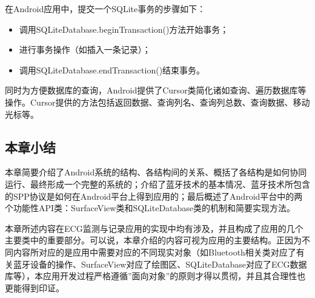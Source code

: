 在Android应用中，提交一个SQLite事务的步骤如下：
\begin{itemize}
\item	调用SQLiteDatabase.beginTransaction()方法开始事务；
\item	进行事务操作（如插入一条记录）；
\item	调用SQLiteDatabase.endTransaction()结束事务。
\end{itemize}

同时为方便数据库的查询，Android提供了Cursor类简化诸如查询、遍历数据库等操作。Cursor提供的方法包括返回数据、查询列名、查询列总数、查询数据、移动光标等。

\subsection{本章小结}

本章简要介绍了Android系统的结构、各结构间的关系、概括了各结构是如何协同运行、最终形成一个完整的系统的；介绍了蓝牙技术的基本情况、蓝牙技术所包含的SPP协议是如何在Android平台上得到应用的；最后概述了Android平台中的两个功能性API类：SurfaceView类和SQLiteDatabase类的机制和简要实现方法。

本章所述内容在ECG监测与记录应用的实现中均有涉及，并且构成了应用的几个主要类中的重要部分。可以说，本章介绍的内容可视为应用的主要结构。正因为不同内容所对应的是应用中需要对应的不同现实对象（如Bluetooth相关类对应了有关蓝牙设备的操作、SurfaceView对应了绘图区、SQLiteDatabase对应了ECG数据库等），本应用开发过程严格遵循”面向对象”的原则才得以贯彻，并且其合理性也更能得到印证。


